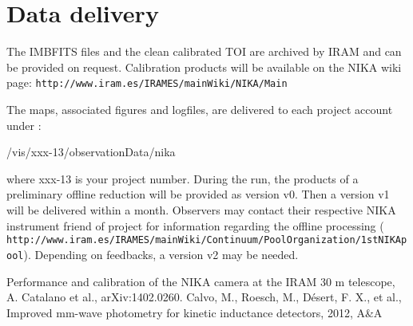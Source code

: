 \documentclass[a4paper,10pt]{article}
\begin{document}
\section{Data delivery}

The IMBFITS files and the clean calibrated TOI are archived by IRAM and can be
provided on request. Calibration products will be available on the NIKA wiki
page: {\tt http://www.iram.es/IRAMES/mainWiki/NIKA/Main}

The maps, associated figures and logfiles, are delivered to each project account under :

/vis/xxx-13/observationData/nika 

where xxx-13 is your project number.  During the run, the products of a
preliminary offline reduction will be provided as version v0. Then a version
v1 will be delivered within a month. Observers may contact their respective
NIKA instrument friend of project for information regarding the offline
processing ({\tt
  http://www.iram.es/IRAMES/mainWiki/Continuum/PoolOrganization/1stNIKApool}). Depending
on feedbacks, a version v2 may be needed.
 

\begin{thebibliography}{}
    Performance and calibration of the NIKA camera at
     the IRAM 30 m telescope, A. Catalano et al.,  arXiv:1402.0260.
    Calvo, M., Roesch, M., D\'esert, F. X., et al., Improved mm-wave photometry for kinetic inductance detectors, 2012, A\&A
\end{thebibliography}
\end{document}
